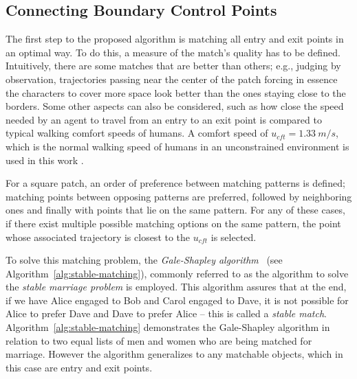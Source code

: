 \subsection{Connecting Boundary Control Points}
\label{sec:method:init}

The first step to the proposed algorithm is matching all entry and exit points in an optimal way.
To do this, a measure of the match's quality has to be defined.
Intuitively, there are some matches that are better than others; e.g., judging by observation, trajectories passing near the center of the patch forcing in essence the characters to cover more space look better than the ones staying close to the borders.
Some other aspects can also be considered, such as how close the speed needed by an agent to travel from an entry to an exit point is compared to typical walking comfort speeds of humans.
A comfort speed of $u_{cft} = 1.33~m/s$, which is the normal walking speed of humans in an unconstrained environment is used in this work \cite{Whittle2003Gait}.

For a square patch, an order of preference between matching patterns is defined; matching points between opposing patterns are preferred, followed by neighboring ones and finally with points that lie on the same pattern.
For any of these cases, if there exist multiple possible matching options on the same pattern, the point whose associated trajectory is closest to the $u_{cft}$ is selected.

To solve this matching problem, the \emph{Gale-Shapley algorithm}~\cite{gale1962college} (see Algorithm~\ref{alg:stable-matching}), commonly referred to as the algorithm to solve the \emph{stable marriage problem} is employed. 
This algorithm assures that at the end, if we have Alice engaged to Bob and Carol engaged to Dave, it is not possible for Alice to prefer Dave and Dave to prefer Alice -- this is called a \emph{stable match}.
%
Algorithm~\ref{alg:stable-matching} demonstrates the Gale-Shapley algorithm in relation to two equal lists of men and women who are being matched for marriage.
However the algorithm generalizes to any matchable objects, which in this case are entry and exit points.

